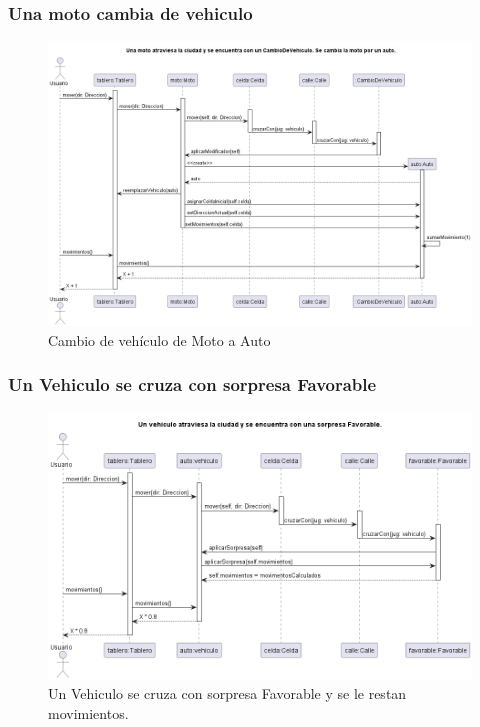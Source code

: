 \documentclass[titlepage,a4paper]{article}
\begin{document}
\subsubsection[Una moto cambia de vehiculo]{Una moto cambia de vehiculo}

\begin{figure}[H]
  \centering
  \includegraphics[width=1\textwidth]{diagramas/SecuenciaMotoCambiaVehiculo.png}
  \caption{\label{fig:class01}Cambio de vehículo de Moto a Auto}
\end{figure}

\subsubsection[Un Vehiculo se cruza con sorpresa Favorable]{Un Vehiculo se cruza con sorpresa Favorable}

\begin{figure}[H]
  \centering
  \includegraphics[width=1\textwidth]{diagramas/SecuenciaVehiculoCruzaSorpresaFavorable.png}
  \caption{\label{fig:class01}Un Vehiculo se cruza con sorpresa Favorable y se le restan movimientos.}
\end{figure}
\end{document}
